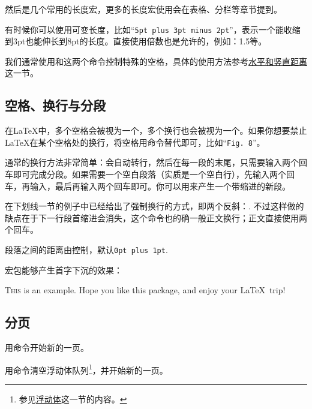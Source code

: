 然后是几个常用的长度宏，更多的长度宏使用会在表格、分栏等章节提到。
\begin{latex}
\textwidth %
\linewidth %
\end{latex}

有时候你可以使用可变长度，比如“\texttt{5pt plus 3pt minus 2pt}”，表示一个能收缩到3pt也能伸长到8pt的长度。直接使用倍数也是允许的，例如：1.5等。

我们通常使用和这两个命令控制特殊的空格，具体的使用方法参考\hyperref[sec:hvspace]{水平和竖直距离}这一节。

\subsection{空格、换行与分段}
在\LaTeX 中，多个空格会被视为一个，多个换行也会被视为一个。如果你想要禁止\LaTeX 在某个空格处的换行，将空格用\texttt{}命令替代即可，比如“\texttt{Fig. 8}”。

通常的换行方法非常简单：会自动转行，然后在每一段的末尾，只需要输入两个回车即可完成分段。如果需要一个空白段落（实质是一个空白行），先输入两个回车，再输入，最后再输入两个回车即可。你可以用来产生一个带缩进的新段。

在下划线一节的例子中已经给出了强制换行的方式，即两个反斜：. 不过这样做的缺点在于下一行段首缩进会消失，这个命令也的确一般正文换行；正文直接使用两个回车。

段落之间的距离由控制，默认\texttt{0pt plus 1pt}. 
\begin{latex}
\setlength{\parskip}{0pt}
\end{latex}

宏包能够产生首字下沉的效果：
\begin{codeshow}
\lettrine{T}{his} is an example. Hope you like this package, and enjoy your \LaTeX\ trip!
\end{codeshow}

\subsection{分页}
用命令开始新的一页。

用命令清空浮动体队列\footnote{参见\hyperref[sec:float]{浮动体}这一节的内容。}，并开始新的一页。

